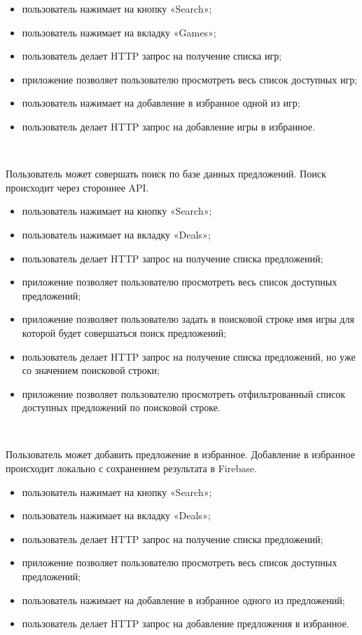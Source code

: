 \begin{itemize}
  \item пользователь нажимает на кнопку «Search»;
  \item пользователь нажимает на вкладку «Games»;
  \item пользователь делает HTTP запрос на получение списка игр;
  \item приложение позволяет пользователю просмотреть весь список доступных игр;
  \item пользователь нажимает на добавление в избранное одной из игр;
  \item пользователь делает HTTP запрос на добавление игры в избранное.
\end{itemize}

~\par
Пользователь может совершать поиск по базе данных предложений. Поиск происходит через стороннее API.

\begin{itemize}
  \item пользователь нажимает на кнопку «Search»;
  \item пользователь нажимает на вкладку «Deals»;
  \item пользователь делает HTTP запрос на получение списка предложений;
  \item приложение позволяет пользователю просмотреть весь список доступных предложений;
  \item приложение позволяет пользователю задать в поисковой строке имя игры для которой будет совершаться поиск предложений;
  \item пользователь делает HTTP запрос на получение списка предложений, но уже со значением поисковой строки;
  \item приложение позволяет пользователю просмотреть отфильтрованный список доступных предложений по поисковой строке.
\end{itemize}


~\par

Пользователь может добавить предложение в избранное. Добавление в избранное происходит локально с сохранением результата в Firebase.

\begin{itemize}
  \item пользователь нажимает на кнопку «Search»;
  \item пользователь нажимает на вкладку «Deals»;
  \item пользователь делает HTTP запрос на получение списка предложений;
  \item приложение позволяет пользователю просмотреть весь список доступных предложений;
  \item пользователь нажимает на добавление в избранное одного из предложений;
  \item пользователь делает HTTP запрос на добавление предложения в избранное.
\end{itemize}



